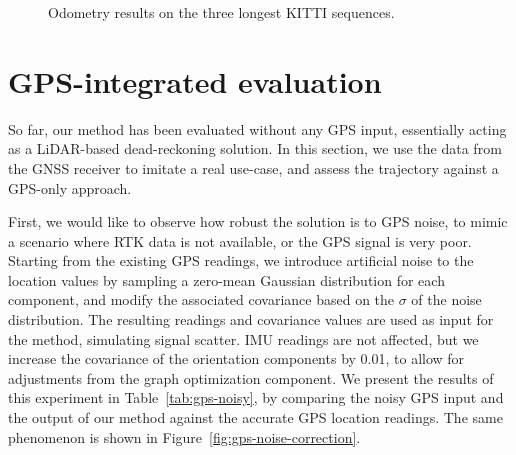 \begin{figure}[h]
    \centering
    \caption[Odometry evaluation on KITTI sequences]{Odometry results on the three longest KITTI sequences.}
    \label{fig:kitti-traj}
\end{figure}

\section{GPS-integrated evaluation}

So far, our method has been evaluated without any GPS input, essentially acting as a LiDAR-based dead-reckoning solution. In this section, we use the data from the GNSS receiver to imitate a real use-case, and assess the trajectory against a GPS-only approach.

First, we would like to observe how robust the solution is to GPS noise, to mimic a scenario where RTK data is not available, or the GPS signal is very poor. Starting from the existing GPS readings, we introduce artificial noise to the location values by sampling a zero-mean Gaussian distribution for each component, and modify the associated covariance based on the $\sigma$ of the noise distribution. The resulting readings and covariance values are used as input for the method, simulating signal scatter. IMU readings are not affected, but we increase the covariance of the orientation components by 0.01, to allow for adjustments from the graph optimization component. We present the results of this experiment in Table~\ref{tab:gps-noisy}, by comparing the noisy GPS input and the output of our method against the accurate GPS location readings. The same phenomenon is shown in Figure~\ref{fig:gps-noise-correction}.

